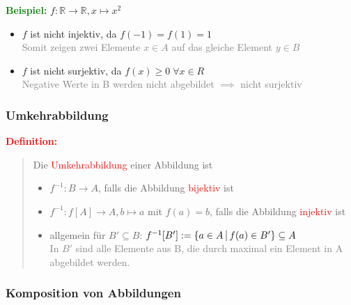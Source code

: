 \documentclass{article}
\newcommand{\smsp}{\phantom{\hspace{3px}}}
\newcommand{\red}[1]{\textcolor{red}{#1}}
\newcommand{\gray}[1]{\textcolor{gray}{#1}}
\newcommand{\green}[1]{\textcolor{green}{#1}}
\newcommand{\ex}{\green{\textbf{Beispiel: }}}
\newcommand{\de}[1]{\red{\textbf{Definition: }}\begin{quote}#1\end{quote}}
\newcommand{\R}{\mathbb{R}}
\newcommand{\vst}{\smsp \vline \smsp}
\begin{document}
\ex $f: \R \to \R, x \mapsto x^2$
\begin{itemize}
    \item $f$ ist nicht injektiv, da $f(-1) = f(1) = 1$\\
    \gray{Somit zeigen zwei Elemente $x \in A$ auf das gleiche Element $y \in B$}
    \item $f$ ist nicht surjektiv, da $f(x) \geq 0 \; \forall x \in R$\\
    \gray{Negative Werte in B werden nicht abgebildet $\implies$ nicht surjektiv}
\end{itemize}

\subsubsection{Umkehrabbildung}
\de{Die \red{Umkehrabbildung} einer Abbildung ist
    \begin{itemize}
        \item $f^{-1}: B \to A$, falls die Abbildung \red{bijektiv} ist
        \item $f^{-1}: f[A] \to A, b \mapsto a$ mit $f(a) = b$, falls die Abbildung \red{injektiv} ist
        \item allgemein für $B' \subseteq B$: $f^{-1}[B'] := \{a \in A \vst f(a) \in B'\} \subseteq A$\\
        \gray{In $B'$ sind alle Elemente aus B, die durch maximal ein Element in A abgebildet werden.}
    \end{itemize}
}

\subsubsection{Komposition von Abbildungen}
\end{document}
